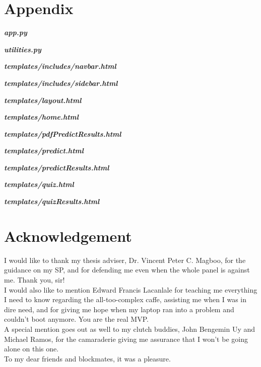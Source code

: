 \documentclass[11pt,a4paper,titlepage]{article}
\let\stdsection\section
\renewcommand\section{\newpage\stdsection}
\newcommand{\+}{\discretionary{\mbox{${\bm\cdot}\mkern-1mu$}}{}{}}
\begin{document}
\section{Appendix}

	\begin{multicols}{2}
		\textbf{\textit{app.py}}
		
	
		\textbf{\textit{utilities.py}}
		
	
		\textbf{\textit{templates/includes/navbar.html}}
		
	
		\textbf{\textit{templates/includes/sidebar.html}}
		
	
		\textbf{\textit{templates/layout.html}}
		
	
		\textbf{\textit{templates/home.html}}
		
	
		\textbf{\textit{templates/pdfPredictResults.html}}
		
	
		\textbf{\textit{templates/predict.html}}
		
	
		\textbf{\textit{templates/predictResults.html}}
		

		\textbf{\textit{templates/quiz.html}}
		
	
		\textbf{\textit{templates/quizResults.html}}
		
	\end{multicols}

\section{Acknowledgement}
\doublespacing
\normalsize
	\qquad I would like to thank my thesis adviser, Dr. Vincent Peter C. Magboo, for the guidance on my SP, and for defending me even when the whole panel is against me. Thank you, sir! \\
	I would also like to mention Edward Francis Lacanlale for teaching me everything I need to know regarding the all-too-complex caffe, assisting me when I was in dire need, and for giving me hope when my laptop ran into a problem and couldn't boot anymore. You are the real MVP. \\
	A special mention goes out as well to my clutch buddies, John Bengemin Uy and Michael Ramos, for the camaraderie giving me assurance that I won't be going alone on this one. \\
	To my dear friends and blockmates, it was a pleasure.
\end{document}

